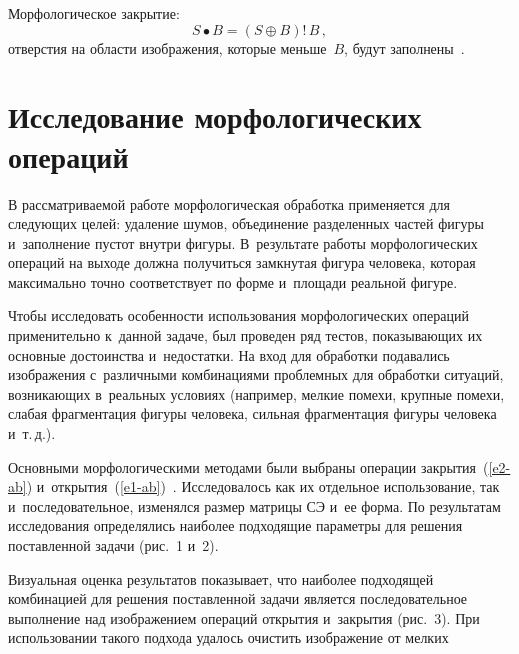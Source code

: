\begin{multicols}{2}
  Морфологическое закрытие:
  \begin{equation}
  S\bullet B =(S\oplus B)!\, B\,,
  \label{e2-ab}
  \end{equation}
отверстия на области изображения, которые меньше~$B$, будут
заполнены~\cite{12-ab}.

\section{Исследование морфологических операций}

  В рассматриваемой работе морфологическая обработ\-ка применяется для
следующих целей: удаление шумов, объединение разделенных частей фигуры и~заполнение пустот внутри фигуры. В~результате работы морфологических
операций на выходе должна получиться замкнутая фигура человека, которая
максимально точно соответствует по форме и~площади реальной фигуре.

Чтобы исследовать особенности использования морфологических
операций применительно к~данной задаче, был проведен ряд тестов,
показы\-ва\-ющих их основные достоинства и~недостатки. На вход для обработки
подавались изображения с~различными комбинациями проблемных для
обработки ситуаций, возникающих в~реальных условиях (например, мелкие
помехи, крупные помехи, слабая фрагментация фигуры человека, сильная
фрагментация фигуры человека и~т.\,д.).

  Основными морфологическими методами были выбраны операции
закрытия~(\ref{e2-ab}) и~открытия~(\ref{e1-ab})~\cite{13-ab}. Исследовалось
как их отдельное использование, так и~последовательное, изменялся размер
матрицы СЭ и~ее форма. По результатам исследования определялись наиболее
подходящие параметры для решения поставленной задачи (рис.~1 и~2).


  Визуальная оценка результатов показывает, что наиболее подходящей
комбинацией для решения поставленной задачи является последовательное
выполнение над изображением операций открытия и~закрытия (рис.~3). При
использовании такого подхода удалось очистить изображение от мелких\linebreak\vspace*{-12pt}
\begin{center}  %
\vspace*{-1pt}
\mbox{%
 \epsfxsize=78mm
 }

\end{center}



\end{multicols}
